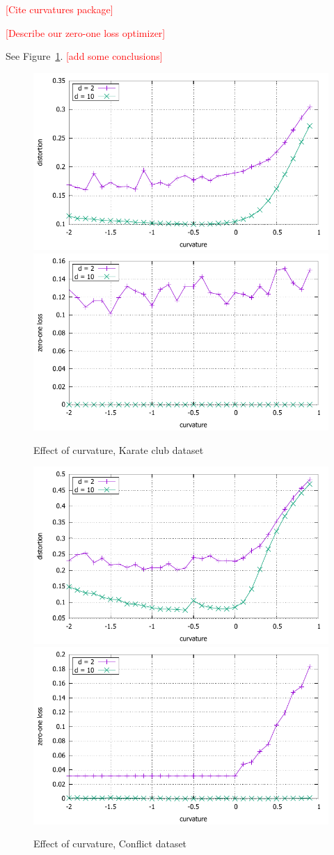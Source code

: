 \documentclass{article} %
\begin{document}
\textcolor{red}{[Cite curvatures package]}

\textcolor{red}{[Describe our zero-one loss optimizer]}

See Figure~\ref{fig:karate}. \textcolor{red}{[add some conclusions]}

\begin{figure}
    \centering
    \includegraphics[width = 0.49 \textwidth]{karate_distortion.pdf}
    \includegraphics[width = 0.49 \textwidth]{karate_zero_one.pdf}
    \caption{Effect of curvature, Karate club dataset}
    \label{fig:karate}
\end{figure}

\begin{figure}
    \centering
    \includegraphics[width = 0.49 \textwidth]{conflict_distortion.pdf}
    \includegraphics[width = 0.49 \textwidth]{conflict_zero_one.pdf}
    \caption{Effect of curvature, Conflict dataset}
    \label{fig:conflict}
\end{figure}
\end{document}
